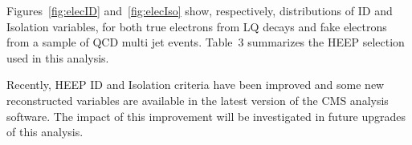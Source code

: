 Figures~\ref{fig:elecID} and~\ref{fig:elecIso} show, respectively, distributions of ID and Isolation variables, 
for both true electrons from LQ decays and fake electrons from a sample of QCD multi jet events. 
Table~3 
summarizes the HEEP selection used in this analysis. 

Recently, HEEP ID and Isolation criteria have been improved
and some new reconstructed variables are available in the latest version 
of the CMS analysis software. 
The impact of this improvement will be investigated in 
future upgrades of this analysis. 






